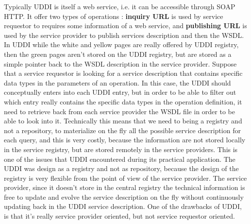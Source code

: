 Typically UDDI is itself a web service, i.e. it can be accessible through SOAP HTTP. It offer two types of operations : \textbf{inquiry URL} is used by service requestor to requires some information of a web service, and \textbf{publishing URL} is used by the service provider to publish services description and then the WSDL. In UDDI while the white and yellow pages are really offered by UDDI registry, then the green pages aren't stored on the UDDI registry, but are stored as a simple pointer back to the WSDL description in the service provider. Suppose that a service requestor is looking for a service description that contains specific data types in the parameters of an operation. In this case, the UDDI should conceptually enters into each UDDI entry, but in order to be able to filter out which entry really contains the specific data types in the operation definition, it need to retrieve back from each service provider the WSDL file in order to be able to look into it. Technically this means that we need to being a registry and not a repository, to materialize on the fly all the possible service description for each query, and this is very costly, because the information are not stored locally in the service registry, but are stored remotely in the service providers. This is one of the issues that UDDI encountered during its practical application. The UDDI was design as a registry and not as repository, because the design of the registry is very flexible from the point of view of the service provider. The service provider, since it doesn't store in the central registry the technical information is free to update and evolve the service description on the fly without continuously updating back in the UDDI service description. One of the drawbacks of UDDI, is that it's really service provider oriented, but not service requestor oriented.
